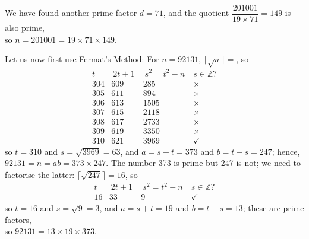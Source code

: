 \documentclass[11pt]{article}
\begin{document}
We have found another prime factor $d = 71$,
and the quotient $\dfrac{201001}{19\times 71} = 149$ is also prime,\\
so $n = 201001 = 19\times 71\times 149$.


\bigskip{}
Let us now first use Fermat's Method:
For $n = 92131$, $\lceil\sqrt{n}\rceil = $, so
\[
  \begin{array}{cccc}
     t  &\  2t + 1 \ &\  s^2 = t^2 -n\  & s\in\mathbb{Z}\text{?} \\\hline
    304 &    609     &      285         & \times \\
    305 &    611     &      894         & \times \\
    306 &    613     &     1505         & \times \\
    307 &    615     &     2118         & \times \\
    308 &    617     &     2733         & \times \\
    309 &    619     &     3350         & \times \\
    310 &    621     &     3969         & \checkmark
  \end{array}
\]
so  $t = 310$ 
and $s = \sqrt{3969} = 63$, 
and $a = s + t = 373$ 
and $b = t - s = 247$;
hence, $92131 = n = ab = 373\times 247$.
The number 373 is prime but 247 is not; 
we need to factorise the latter:
$\lceil\sqrt{247}\rceil = 16$, so
\[
  \begin{array}{cccc}
     t  &\  2t + 1 \ &\  s^2 = t^2 -n\  & s\in\mathbb{Z}\text{?} \\\hline
     16 &     33     &       9          & \checkmark
  \end{array}
\]
so  $t = 16$ and $s = \sqrt{9} = 3$, 
and $a = s + t = 19$ and $b = t - s = 13$;
these are prime factors,\\
so $92131 = 13\times 19\times 373$.
\end{document}
